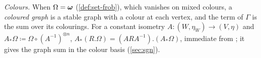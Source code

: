 \begin{defn}
\emph{Colours.} When $\Omega=\boldsymbol{\omega}$ (\cref{def:set-frob}), which vanishes on mixed colours, a \emph{coloured graph} is a stable graph with a colour at each vertex, and the term of $\Gamma$ is the sum over its colourings. For a constant isometry $A\colon(W,\eta_W)\to(V,\eta)$ and $A_*\Omega\coloneqq\Omega\circ(A^{-1})^{\otimes n}$, $A_*(R.\Omega)=(ARA^{-1}).(A_*\Omega)$, immediate from \cite[Defs.~2.2, 2.13]{PPZ15}; it gives the graph sum in the colour basis (\cref{sec:sgn}).
\end{defn}


